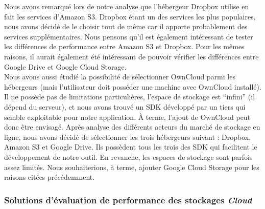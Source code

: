 \documentclass[10pt]{article}
\begin{document}
Nous avons remarqué lors de notre analyse que l’hébergeur Dropbox
utilise en fait les services d'Amazon S3. Dropbox étant un des
services les plus populaires, nous avons décidé de le choisir tout de
même car il apporte probablement des services supplémentaires. Nous
pensons qu’il est également intéressant de tester les différences de
performance entre Amazon S3 et Dropbox. Pour les mêmes raisons, il aurait
également été intéressant de pouvoir vérifier les différences entre
Google Drive et Google Cloud Storage.\\

Nous avons aussi étudié la possibilité de sélectionner OwnCloud parmi
les hébergeurs (mais l’utilisateur doit posséder une machine avec
OwnCloud installé). Il ne possède pas de limitations particulières,
l’espace de stockage est “infini” (il dépend du serveur), et nous
avons trouvé un SDK développé par un tiers qui semble exploitable pour
notre application. À terme, l’ajout de OwnCloud peut donc être
envisagé. Après analyse des différents acteurs du marché de stockage
en ligne, nous avons décidé de sélectionner les trois hébergeurs
suivant : Dropbox, Amazon S3 et Google Drive. Ils possèdent tous les
trois des SDK qui facilitent le développement de notre outil. En
revanche, les espaces de stockage sont parfois assez limités. Nous
souhaiterions, à terme, ajouter Google Cloud Storage pour les raisons
citées précédemment.

\subsubsection{Solutions d'évaluation de performance des stockages \textit{Cloud}}
\end{document}
